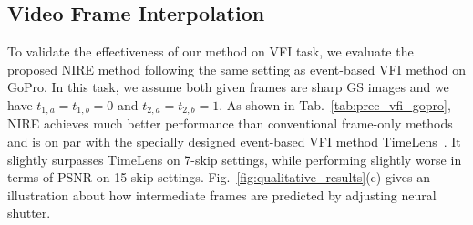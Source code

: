 \documentclass[10pt,twocolumn,letterpaper]{article}
\begin{document}
\subsection{Video Frame Interpolation}
To validate the effectiveness of our method on VFI task,
we evaluate the proposed NIRE method following the same setting as event-based VFI method\cite{TimeLens} on GoPro. 
In this task, we assume both given frames are sharp GS images and we have $t_{1,a}=t_{1,b}=0$ and $t_{2,a}=t_{2,b}=1$.
As shown in Tab.~\ref{tab:prec_vfi_gopro}, NIRE achieves much better performance than conventional frame-only methods and is on par with the specially designed event-based VFI method TimeLens~\cite{TimeLens}.
It slightly surpasses TimeLens on 7-skip settings, while performing slightly worse in terms of PSNR on 15-skip settings.
Fig.~\ref{fig:qualitative_results}(c) gives an illustration about how intermediate frames are predicted by adjusting neural shutter.
\begin{table}[h!]
\caption{Performance on video frame interpolation}
\centering
{}
\label{tab:prec_vfi_gopro}
\end{table}
\end{document}
